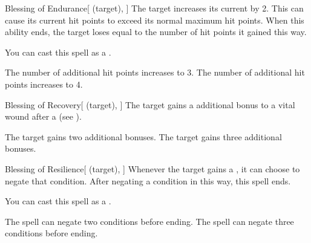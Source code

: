 \lowercase{\hypertarget{spell:Blessing of Endurance}{}}\label{spell:Blessing of Endurance}
\begin{attuneability}[Rank 3]{\hypertarget{spell:Blessing of Endurance}{Blessing of Endurance}}[ (target), ]
The target increases its current  by 2.
This can cause its current hit points to exceed its normal maximum hit points.
When this ability ends, the target loses  equal to the number of hit points it gained this way.

You can cast this spell as a .

\rankline
{} The number of additional hit points increases to 3.
 The number of additional hit points increases to 4.

\end{attuneability}
\vspace{0.25em}



\lowercase{\hypertarget{spell:Blessing of Recovery}{}}\label{spell:Blessing of Recovery}
\begin{attuneability}[Rank 3]{\hypertarget{spell:Blessing of Recovery}{Blessing of Recovery}}[ (target), ]
The target gains a additional  bonus to a vital wound after a  (see ).

\rankline
{} The target gains two additional  bonuses.
 The target gains three additional  bonuses.

\end{attuneability}
\vspace{0.25em}



\lowercase{\hypertarget{spell:Blessing of Resilience}{}}\label{spell:Blessing of Resilience}
\begin{attuneability}[Rank 3]{\hypertarget{spell:Blessing of Resilience}{Blessing of Resilience}}[ (target), ]
Whenever the target gains a , it can choose to negate that condition.
After negating a condition in this way, this spell ends.

You can cast this spell as a .

\rankline
{} The spell can negate two conditions before ending.
 The spell can negate three conditions before ending.

\end{attuneability}
\vspace{0.25em}



